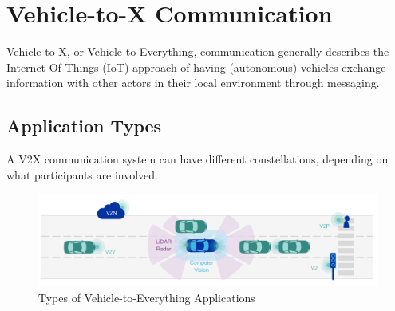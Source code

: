 \section{Vehicle-to-X Communication}
\label{sec:background:v2x_communication}
Vehicle-to-X, or Vehicle-to-Everything, communication generally describes the Internet Of Things (IoT) approach of having (autonomous) vehicles exchange information with other actors in their local environment through messaging.

\subsection{Application Types}
\label{subsec:background:application_types}
A V2X communication system can have different constellations, depending on what participants are involved.

\begin{figure}[H]
	\centering
	\includegraphics[width=1.0\textwidth]{98_images/v2x_types.png}
	\caption{Types of Vehicle-to-Everything Applications \cite{5GAutomotiveAssociation2016}}
	\label{fig:v2x_types}
\end{figure}

